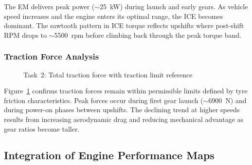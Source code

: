 The EM delivers peak power ($\sim$25~kW) during launch and early gears. As vehicle speed increases and the engine enters its optimal range, the ICE becomes dominant. The sawtooth pattern in ICE torque reflects upshifts where post-shift RPM drops to $\sim$5500~rpm before climbing back through the peak torque band.

\subsubsection{Traction Force Analysis}

\begin{figure}[H]
    \centering
    \caption{Task~2: Total traction force with traction limit reference}
    \label{fig:task2_traction}
\end{figure}

Figure~\ref{fig:task2_traction} confirms traction forces remain within permissible limits defined by tyre friction characteristics. Peak forces occur during first gear launch ($\sim$6900~N) and during power-on phases between upshifts. The declining trend at higher speeds results from increasing aerodynamic drag and reducing mechanical advantage as gear ratios become taller.

\subsection{Integration of Engine Performance Maps}

